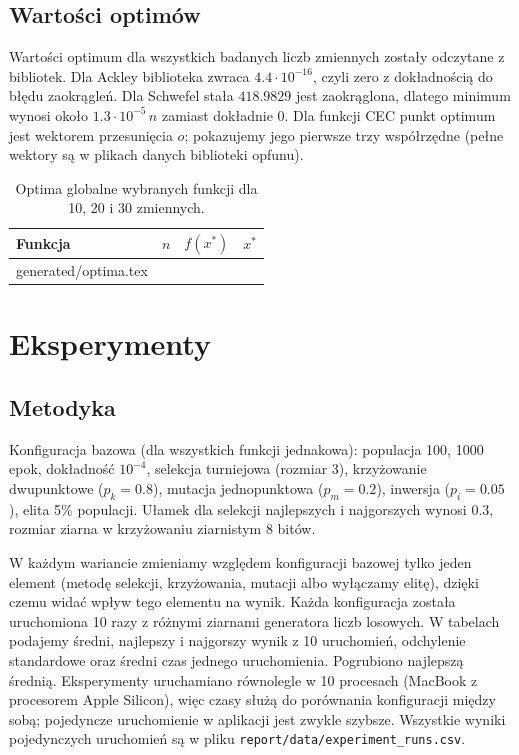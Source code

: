 \documentclass[11pt,a4paper]{article}
\makeatletter
\newcommand{\tabinput}[1]{\@@input #1 }
\makeatother
\begin{document}
\subsection{Wartości optimów}

Wartości optimum dla wszystkich badanych liczb zmiennych zostały odczytane z bibliotek.
Dla Ackley biblioteka zwraca $4.4\cdot10^{-16}$, czyli zero z dokładnością do błędu zaokrągleń.
Dla Schwefel stała $418.9829$ jest zaokrąglona, dlatego minimum wynosi około $1.3\cdot10^{-5}\,n$
zamiast dokładnie 0. Dla funkcji CEC punkt optimum jest wektorem przesunięcia $o$; pokazujemy jego
pierwsze trzy współrzędne (pełne wektory są w plikach danych biblioteki opfunu).

\begin{table}[H]
\centering
\small
\begin{tabular}{lrrl}
\toprule
Funkcja & $n$ & $f(x^*)$ & $x^*$ \\
\midrule
\tabinput{generated/optima.tex}
\bottomrule
\end{tabular}
\caption{Optima globalne wybranych funkcji dla 10, 20 i 30 zmiennych.}
\end{table}

\section{Eksperymenty}
\label{sec:experiments}

\subsection{Metodyka}

Konfiguracja bazowa (dla wszystkich funkcji jednakowa):
populacja 100, 1000 epok, dokładność $10^{-4}$, selekcja turniejowa (rozmiar 3),
krzyżowanie dwupunktowe ($p_k = 0.8$), mutacja jednopunktowa ($p_m = 0.2$),
inwersja ($p_i = 0.05$), elita 5\% populacji. Ułamek dla selekcji najlepszych i najgorszych
wynosi 0.3, rozmiar ziarna w krzyżowaniu ziarnistym 8 bitów.

W każdym wariancie zmieniamy względem konfiguracji bazowej tylko jeden element (metodę selekcji,
krzyżowania, mutacji albo wyłączamy elitę), dzięki czemu widać wpływ tego elementu na wynik.
Każda konfiguracja została uruchomiona 10 razy z różnymi ziarnami generatora liczb losowych.
W tabelach podajemy średni, najlepszy i najgorszy wynik z 10 uruchomień, odchylenie standardowe
oraz średni czas jednego uruchomienia. Pogrubiono najlepszą średnią. Eksperymenty uruchamiano
równolegle w 10 procesach (MacBook z procesorem Apple Silicon), więc czasy służą do porównania
konfiguracji między sobą; pojedyncze uruchomienie w aplikacji jest zwykle szybsze.
Wszystkie wyniki pojedynczych uruchomień są w pliku \texttt{report/data/experiment\_runs.csv}.
\end{document}
